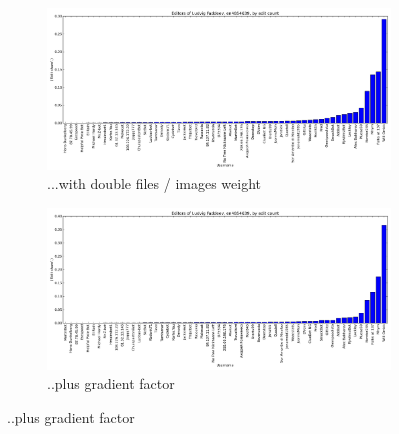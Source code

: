 \begin{figure}[H]
  \ContinuedFloat  
  
  \centering
  \begin{subfigure}[b]{0.7\linewidth}
    \centering
    \includegraphics[width=\linewidth]{img/weightings/LudvigFaddeevfilesimages.png}
    \caption{...with double files / images weight}
  \end{subfigure}
  \begin{subfigure}[b]{0.7\linewidth}
    \centering
    \includegraphics[width=\linewidth]{img/weightings/LudvigFaddeevfilesimagesGradient.png}
    \caption{..plus gradient factor}
  \end{subfigure}


\end{figure}
